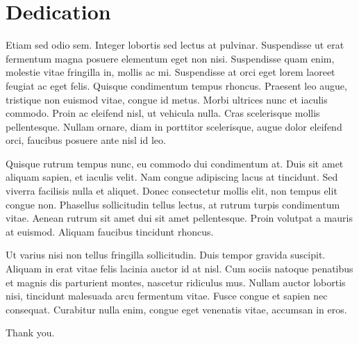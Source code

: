 \chapter{Dedication}

Etiam sed odio sem. Integer lobortis sed lectus at pulvinar. Suspendisse ut erat fermentum magna posuere elementum eget non nisi. Suspendisse quam enim, molestie vitae fringilla in, mollis ac mi. Suspendisse at orci eget lorem laoreet feugiat ac eget felis. Quisque condimentum tempus rhoncus. Praesent leo augue, tristique non euismod vitae, congue id metus. Morbi ultrices nunc et iaculis commodo. Proin ac eleifend nisl, ut vehicula nulla. Cras scelerisque mollis pellentesque. Nullam ornare, diam in porttitor scelerisque, augue dolor eleifend orci, faucibus posuere ante nisl id leo.

Quisque rutrum tempus nunc, eu commodo dui condimentum at. Duis sit amet aliquam sapien, et iaculis velit. Nam congue adipiscing lacus at tincidunt. Sed viverra facilisis nulla et aliquet. Donec consectetur mollis elit, non tempus elit congue non. Phasellus sollicitudin tellus lectus, at rutrum turpis condimentum vitae. Aenean rutrum sit amet dui sit amet pellentesque. Proin volutpat a mauris at euismod. Aliquam faucibus tincidunt rhoncus.

Ut varius nisi non tellus fringilla sollicitudin. Duis tempor gravida suscipit. Aliquam in erat vitae felis lacinia auctor id at nisl. Cum sociis natoque penatibus et magnis dis parturient montes, nascetur ridiculus mus. Nullam auctor lobortis nisi, tincidunt malesuada arcu fermentum vitae. Fusce congue et sapien nec consequat. Curabitur nulla enim, congue eget venenatis vitae, accumsan in eros.

\begin{center}
Thank you.
\end{center}
